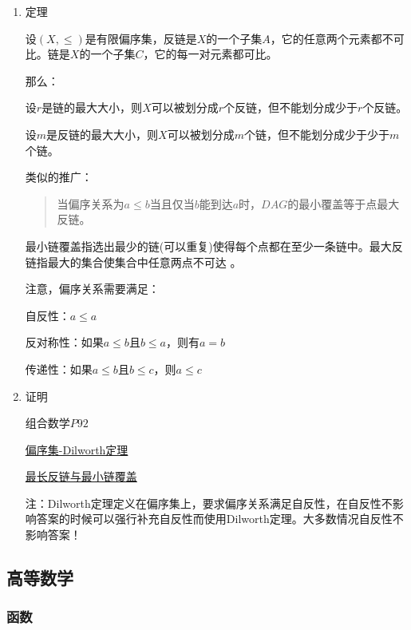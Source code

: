 \documentclass[11pt]{article}
\begin{document}
\begin{enumerate}
\item 定理
\label{sec:orgeae2d5a}

设\((X,\leq)\)是有限偏序集，反链是\(X\)的一个子集\(A\)，它的任意两个元素都不可比。链是\(X\)的一个子集\(C\)，它的每一对元素都可比。

那么：

设\(r\)是链的最大大小，则\(X\)可以被划分成\(r\)个反链，但不能划分成少于\(r\)个反链。

设\(m\)是反链的最大大小，则\(X\)可以被划分成\(m\)个链，但不能划分成少于少于\(m\)个链。

类似的推广：

\begin{quote}
当偏序关系为\(a \leq b\)当且仅当\(b\)能到达\(a\)时，\(DAG\)的最小覆盖等于点最大反链。
\end{quote}

最小链覆盖指选出最少的链(可以重复)使得每个点都在至少一条链中。最大反链指最大的集合使集合中任意两点不可达 。


注意，偏序关系需要满足：

自反性：\(a \leq a\)

反对称性：如果\(a \leq b\)且\(b \leq a\)，则有\(a = b\)

传递性：如果\(a \leq b\)且\(b \leq c\)，则\(a \leq c\)

\item 证明
\label{sec:orgcded198}

组合数学\(P92\)

\href{http://blog.csdn.net/xuzengqiang/article/details/7266034}{偏序集-Dilworth定理}

\href{http://vfleaking.blog.163.com/blog/static/1748076342012918105514527}{最长反链与最小链覆盖}

注：Dilworth定理定义在偏序集上，要求偏序关系满足自反性，在自反性不影响答案的时候可以强行补充自反性而使用Dilworth定理。大多数情况自反性不影响答案！
\end{enumerate}
\subsection{高等数学}
\label{sec:org5d0647e}
\subsubsection{函数}
\label{sec:org892a194}
\end{document}
